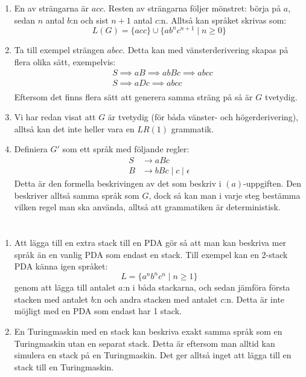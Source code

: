 \documentclass{article}
\begin{document}
\begin{enumerate}[label=(\alph*)]
    \item 
        En av strängarna är $acc$. Resten av strängarna följer mönstret: börja på $a$, sedan $n$ antal $b$:n och sist $n+1$ antal $c$:n. Alltså kan språket skrivas som:
        $$L(G) =\{acc\} \cup \{ab^nc^{n+1} \mid n \ge 0 \}$$
    \item
        Ta till exempel strängen $abcc$. Detta kan med vänsterderivering skapas på flera olika sätt, exempelvis:
        \begin{align*}
        &S \implies aB  \implies abBc \implies abcc \\
        &S \implies aDc \implies abcc \\
        \end{align*}
        Eftersom det finns flera sätt att generera samma sträng på så är $G$ tvetydig.
        
    \item 
        Vi har redan visat att $G$ är tvetydig (för båda vänster- och högerderivering), alltså kan det inte heller vara en $LR(1)$ grammatik.
    \item
        Definiera $G'$ som ett språk med följande regler:
        \begin{align*}
            S & \to aBc \\
            B & \to bBc \mid c \mid \epsilon
        \end{align*}
        Detta är den formella beskrivingen av det som beskriv i $(a)$-uppgiften. Den beskriver alltså samma språk som $G$, dock så kan man i varje steg bestämma vilken regel man ska använda, alltså att grammatiken är deterministisk.

\end{enumerate}

\section{}

\begin{enumerate}[label=(\alph*)]
    \item Att lägga till en extra stack till en PDA gör så att man kan beskriva mer språk än en vanlig PDA som endast en stack. Till exempel kan en 2-stack PDA känna igen språket:
    $$L = \{a^nb^nc^n \mid n \ge 1 \}$$
    genom att lägga till antalet $a$:n i båda stackarna, och sedan jämföra första stacken med antalet $b$:n och andra stacken med antalet $c$:n.
    Detta är inte möjligt med en PDA som endast har 1 stack.
    
    \item En Turingmaskin med en stack kan beskriva exakt samma språk som en Turingmaskin utan en separat stack. Detta är eftersom man alltid kan simulera en stack på en Turingmaskin. Det ger alltså inget att lägga till en stack till en Turingmaskin.
\end{enumerate}
\end{document}
